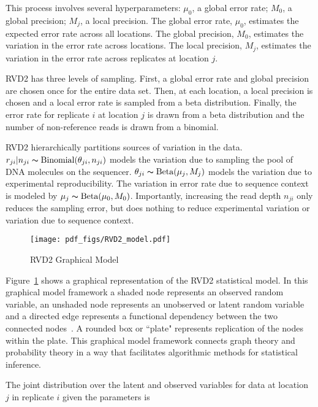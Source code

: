 \documentclass[11pt,reqno]{amsart}
\begin{document}
This process involves several hyperparameters: $\mu_0$, a global error rate; $M_0$, a global precision; $M_j$, a local precision. The global error rate, $\mu_0$, estimates the expected error rate across all locations. The global precision, $M_0$, estimates the variation in the error rate  across locations. The local precision, $M_j$, estimates the variation in the error rate across replicates at location $j$.

RVD2 has three levels of sampling. First, a global error rate and global precision are chosen once for the entire data set. Then, at each location, a local precision is chosen and a local error rate is sampled from a beta distribution. Finally, the error rate for replicate $i$ at location $j$ is drawn from a beta distribution and the number of non-reference reads is drawn from a binomial.

RVD2 hierarchically partitions sources of variation in the data. $r_{ji} | n_{ji} \thicksim \text{Binomial}(\theta_{ji}, n_{ji})$ models the variation due to sampling the pool of DNA molecules on the sequencer. $\theta_{ji} \thicksim \text{Beta}(\mu_j, M_j)$ models the variation due to experimental reproducibility. The variation in error rate due to sequence context is modeled by $\mu_j \thicksim \text{Beta}(\mu_0, M_0)$. Importantly, increasing the read depth $n_{ji}$ only reduces the sampling error, but does nothing to reduce experimental variation or variation due to sequence context.

\begin{figure}[h]
\begin{center}
\texttt{[image: pdf\_figs/RVD2\_model.pdf]}
\caption{RVD2 Graphical Model}
\label{fig:graphical_model}
\end{center}
\end{figure}

Figure~\ref{fig:graphical_model} shows a graphical representation of the RVD2 statistical model. In this graphical model framework a shaded node represents an observed random variable, an unshaded node represents an unobserved or latent random variable and a directed edge represents a functional dependency between the two connected nodes~\cite{}. A rounded box or ``plate" represents replication of the nodes within the plate. This graphical model framework connects graph theory and probability theory in a way that facilitates algorithmic methods for statistical inference.

The joint distribution over the latent and observed variables for data at location $j$ in replicate $i$ given the parameters is
\end{document}
